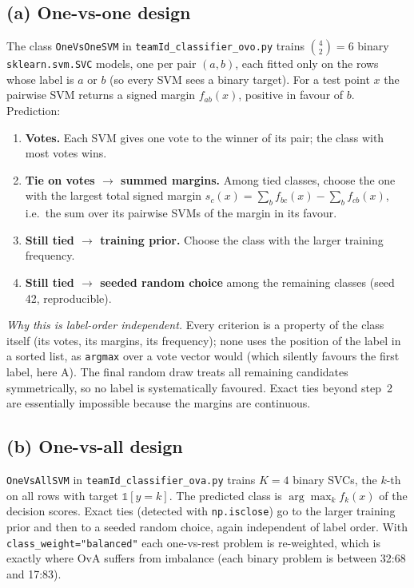\documentclass[11pt]{article}
\begin{document}
\subsection{(a) One-vs-one design}
The class \texttt{OneVsOneSVM} in \texttt{teamId\_classifier\_ovo.py} trains
$\binom{4}{2}=6$ binary \texttt{sklearn.svm.SVC} models, one per pair $(a,b)$, each fitted only on
the rows whose label is $a$ or $b$ (so every SVM sees a binary target). For a test point $x$ the
pairwise SVM returns a signed margin $f_{ab}(x)$, positive in favour of $b$. Prediction:
\begin{enumerate}
\item \textbf{Votes.} Each SVM gives one vote to the winner of its pair; the class with most votes wins.
\item \textbf{Tie on votes $\rightarrow$ summed margins.} Among tied classes, choose the one with the
largest total signed margin $s_c(x)=\sum_{b}f_{bc}(x)-\sum_{b}f_{cb}(x)$, i.e.\ the sum over its
pairwise SVMs of the margin in its favour.
\item \textbf{Still tied $\rightarrow$ training prior.} Choose the class with the larger training frequency.
\item \textbf{Still tied $\rightarrow$ seeded random choice} among the remaining classes (seed 42, reproducible).
\end{enumerate}
\emph{Why this is label-order independent.} Every criterion is a property of the class itself (its
votes, its margins, its frequency); none uses the position of the label in a sorted list, as
\texttt{argmax} over a vote vector would (which silently favours the first label, here A). The
final random draw treats all remaining candidates symmetrically, so no label is systematically
favoured. Exact ties beyond step~2 are essentially impossible because the margins are continuous.

\subsection{(b) One-vs-all design}
\texttt{OneVsAllSVM} in \texttt{teamId\_classifier\_ova.py} trains $K=4$ binary SVCs, the
$k$-th on all rows with target $\mathbb{1}[y=k]$. The predicted class is
$\arg\max_k f_k(x)$ of the decision scores. Exact ties (detected with \texttt{np.isclose}) go to the
larger training prior and then to a seeded random choice, again independent of label order.
With \texttt{class\_weight="balanced"} each one-vs-rest problem is re-weighted, which is exactly
where OvA suffers from imbalance (each binary problem is between 32:68 and 17:83).
\end{document}
